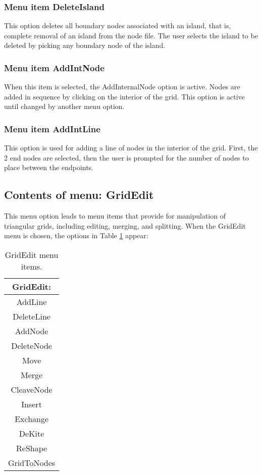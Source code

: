 \documentclass{article}
\begin{document}
\subsubsection[Menu item DeleteIsland]{Menu item DeleteIsland}
This option deletes all boundary nodes associated with an island, that is, complete removal of an island from the node file. The user selects the island to be deleted by picking any boundary node of the island.

\subsubsection[Menu item AddIntNode]{Menu item AddIntNode}
When this item is selected, the AddInternalNode option is active. Nodes are added in sequence by clicking on the interior of the grid. This option is active until changed by another menu option.

\subsubsection[Menu item AddIntLine]{Menu item AddIntLine}
This option is used for adding a line of nodes in the interior of the grid. First, the 2 end nodes are selected, then the user is prompted for the number of nodes to place between the endpoints.


\subsection{Contents of menu: GridEdit}
This menu option leads to menu items that provide for manipulation of triangular grids, including editing, merging, and splitting. When the GridEdit menu is chosen, the options in Table \ref{tab:GRIDEDIT} appear:

\begin{table}[htb!]
 \caption{GridEdit menu items.}
  \begin{center}
   \begin{tabular}{|c|}
    \hline
GridEdit:\\     \hline
AddLine \\ DeleteLine \\ AddNode \\ DeleteNode \\ Move \\ Merge \\    \hline
CleaveNode \\ Insert \\ Exchange \\ DeKite \\ ReShape \\     \hline
GridToNodes \\
    \hline
   \end{tabular}
   \label{tab:GRIDEDIT}
  \end{center}
\end{table}
\end{document}
